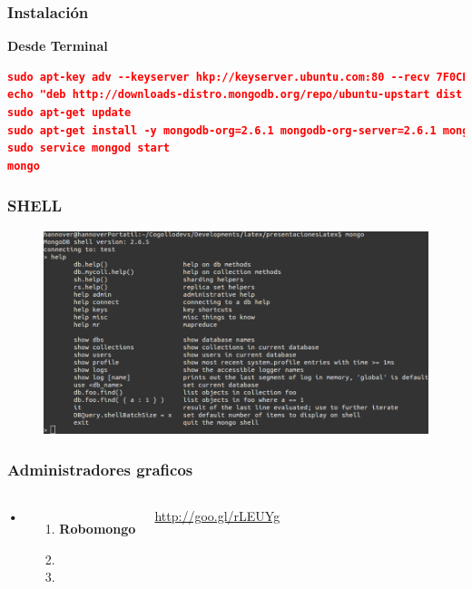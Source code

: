 \documentclass{beamer}
\begin{document}

\begin{frame}[fragile] %
\frametitle{Instalaci\'on}
\textbf{Desde Terminal}
\begin{lstlisting}[language=json,firstnumber=1]
sudo apt-key adv --keyserver hkp://keyserver.ubuntu.com:80 --recv 7F0CEB10
echo "deb http://downloads-distro.mongodb.org/repo/ubuntu-upstart dist 10gen" | sudo tee /etc/apt/sources.list.d/mongodb.list
sudo apt-get update
sudo apt-get install -y mongodb-org=2.6.1 mongodb-org-server=2.6.1 mongodb-org-shell=2.6.1 mongodb-org-mongos=2.6.1 mongodb-org-tools=2.6.1
sudo service mongod start
mongo
\end{lstlisting}

\end{frame}


\begin{frame}
\frametitle{SHELL}
\begin{figure}
\includegraphics[width=1\linewidth]{shellterminal.png}
\end{figure}
\end{frame}


\begin{frame}
\frametitle{Administradores graficos}
\begin{columns}[c] %

\textbf{•}
\begin{enumerate}
\item \textbf{Robomongo}
\item[•]
\item[•]
\end{enumerate}

{\color{blue}\url{http://goo.gl/rLEUYg}}
\end{columns}

\end{frame}
\end{document}
